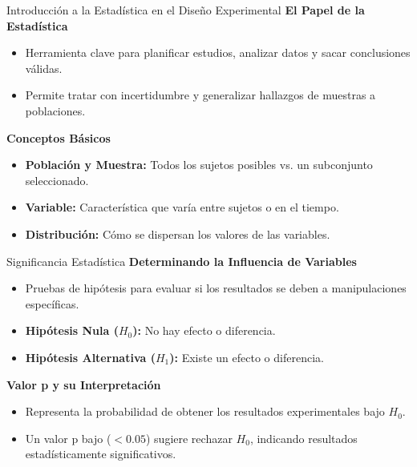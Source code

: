 ﻿\documentclass{beamer}
\begin{document}
\begin{frame}{Introducción a la Estadística en el Diseño Experimental}
    \textbf{El Papel de la Estadística}
    \begin{itemize}
        \item Herramienta clave para planificar estudios, analizar datos y sacar conclusiones válidas.
        \item Permite tratar con incertidumbre y generalizar hallazgos de muestras a poblaciones.
    \end{itemize}

    \textbf{Conceptos Básicos}
    \begin{itemize}
        \item \textbf{Población y Muestra:} Todos los sujetos posibles vs. un subconjunto seleccionado.
        \item \textbf{Variable:} Característica que varía entre sujetos o en el tiempo.
        \item \textbf{Distribución:} Cómo se dispersan los valores de las variables.
    \end{itemize}
\end{frame}

\begin{frame}{Significancia Estadística}
    \textbf{Determinando la Influencia de Variables}
    \begin{itemize}
        \item Pruebas de hipótesis para evaluar si los resultados se deben a manipulaciones específicas.
        \item \textbf{Hipótesis Nula ($H_0$):} No hay efecto o diferencia.
        \item \textbf{Hipótesis Alternativa ($H_1$):} Existe un efecto o diferencia.
    \end{itemize}

    \textbf{Valor p y su Interpretación}
    \begin{itemize}
        \item Representa la probabilidad de obtener los resultados experimentales bajo $H_0$.
        \item Un valor p bajo ($<0.05$) sugiere rechazar $H_0$, indicando resultados estadísticamente significativos.
    \end{itemize}
\end{frame}
\end{document}
